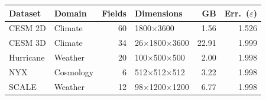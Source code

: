 \begin{tabular}{@{}llrlrr@{}}
\toprule
\textbf{Dataset} & \textbf{Domain} & \textbf{Fields} & \textbf{Dimensions} & \textbf{GB} & \textbf{Err.\ ($\varepsilon$)} \\
\midrule
CESM 2D & Climate & 60 & 1800$\times$3600 & 1.56 & 1.526 \\
CESM 3D & Climate & 34 & 26$\times$1800$\times$3600 & 22.91 & 1.999 \\
Hurricane & Weather & 20 & 100$\times$500$\times$500 & 2.00 & 1.998 \\
NYX & Cosmology & 6 & 512$\times$512$\times$512 & 3.22 & 1.998 \\
SCALE & Weather & 12 & 98$\times$1200$\times$1200 & 6.77 & 1.998 \\
\bottomrule
\end{tabular}
